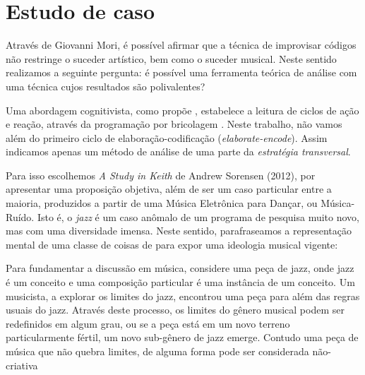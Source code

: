 \chapter{Estudo de caso}\label{cap:estudos_de_caso}

Através de Giovanni Mori, é possível afirmar que a técnica de improvisar códigos não restringe o suceder artístico, bem como o suceder musical. Neste sentido realizamos a seguinte pergunta: é possível uma ferramenta teórica de análise com uma técnica cujos resultados são polivalentes?

Uma abordagem cognitivista, como propõe , estabelece a leitura de ciclos de ação e reação, através da programação por bricolagem . Neste trabalho, não vamos além do primeiro ciclo de elaboração-codificação (\emph{elaborate-encode}). Assim indicamos apenas um método de análise de uma parte da  \emph{estratégia transversal}. 


Para isso escolhemos \emph{A Study in Keith} de Andrew Sorensen (2012), por apresentar uma proposição objetiva, além de ser um caso particular entre a maioria, produzidos a partir de uma Música Eletrônica para Dançar, ou Música-Ruído. Isto é, o \emph{jazz} é um caso anômalo de um programa de pesquisa muito novo, mas com uma diversidade imensa. Neste sentido, parafraseamos a representação mental de uma classe de coisas de  para expor uma ideologia musical vigente:

\begin{citacao}
Para fundamentar a discussão em música, considere uma peça de jazz, onde jazz é um conceito e uma composição particular é uma instância de um conceito. Um musicista, a explorar os limites do jazz, encontrou uma peça para além das regras usuais do jazz. Através deste processo, os limites do gênero musical podem ser redefinidos em algum grau, ou se a peça está em um novo terreno particularmente fértil, um novo sub-gênero de jazz emerge. Contudo uma peça de música que não quebra limites, de alguma forma pode ser considerada não-criativa 
\end{citacao}


